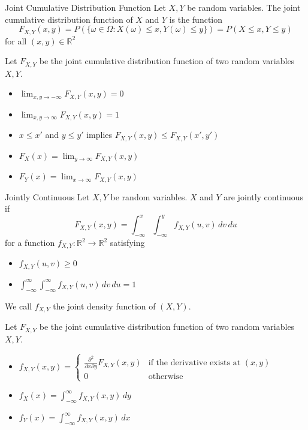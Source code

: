 \documentclass[a4paper]{article}
\begin{document}
\begin{defn}{Joint Cumulative Distribution Function}{} Let $X,Y$ be random variables. The joint cumulative distribution function of $X$ and $Y$ is the function $$F_{X,Y}(x,y)=P(\{\omega\in\Omega:X(\omega)\leq x,Y(\omega)\leq y\})=P(X\leq x,Y\leq y)$$ for all $(x,y)\in\mathbb{R}^2$
\end{defn}

\begin{thm}{}{} Let $F_{X,Y}$ be the joint cumulative distribution function of two random variables $X,Y$. 
\begin{itemize}
\item $\lim_{x,y\to-\infty}F_{X,Y}(x,y)=0$
\item $\lim_{x,y\to\infty}F_{X,Y}(x,y)=1$
\item $x\leq x'$ and $y\leq y'$ implies $F_{X,Y}(x,y)\leq F_{X,Y}(x',y')$
\item $F_X(x)=\lim_{y\to\infty}F_{X,Y}(x,y)$
\item $F_Y(x)=\lim_{x\to\infty}F_{X,Y}(x,y)$
\end{itemize}
\end{thm}

\begin{defn}{Jointly Continuous}{} Let $X,Y$ be random variables. $X$ and $Y$ are jointly continuous if $$F_{X,Y}(x,y)=\int_{-\infty}^{x}\int_{-\infty}^{y}f_{X,Y}(u,v)\,dv\,du$$ for a function $f_{X,Y}:\mathbb{R}^2\to\mathbb{R}^2$ satisfying
\begin{itemize}
\item $f_{X,Y}(u,v)\geq 0$
\item $\int_{-\infty}^{\infty}\int_{-\infty}^{\infty}f_{X,Y}(u,v)\,dv\,du=1$
\end{itemize}
We call $f_{X,Y}$ the joint density function of $(X,Y)$. 
\end{defn}

\begin{thm}{}{} Let $F_{X,Y}$ be the joint cumulative distribution function of two random variables $X,Y$. 
\begin{itemize}
\item $f_{X,Y}(x,y)=\begin{cases}
\frac{\partial^2}{\partial x\partial y}F_{X,Y}(x,y)&\text{if the derivative exists at $(x,y)$}\\
0&\text{otherwise}
\end{cases}$
\item $f_X(x)=\int_{-\infty}^{\infty}f_{X,Y}(x,y)\,dy$
\item $f_Y(x)=\int_{-\infty}^{\infty}f_{X,Y}(x,y)\,dx$
\end{itemize}
\end{thm}
\end{document}
